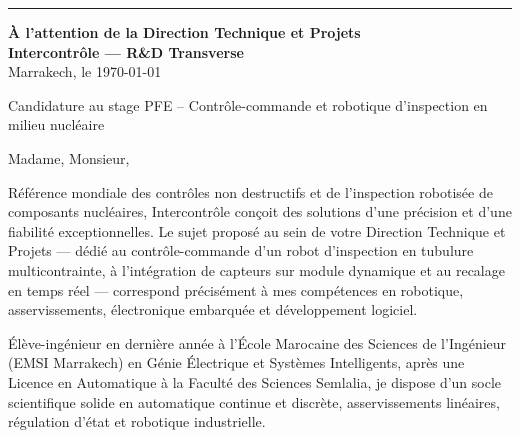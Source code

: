 \documentclass[10pt,a4paper]{altacv}
\makeatletter
\renewcommand{\makecvheader}{%
  \begingroup
    \raggedright\color{emphasis}%
    {\LARGE\bfseries\MakeUppercase{\@name}\par}\vspace{2pt}
    {\normalsize\bfseries\color{accent}\@tagline\par}\vspace{3.5pt}
    {\footnotesize\color{emphasis}\@personalinfo\par}
  \endgroup\vspace{4pt}
  {\color{heading}\rule{\linewidth}{1.2pt}}\par\vspace{8pt}
}
\makeatother
\begin{document}

\makecvheader

\begin{flushright}
  {\color{emphasis}\textbf{À l'attention de la Direction Technique et Projets}} \\[2pt]
  \textbf{Intercontrôle — R\&D Transverse} \\[8pt]
  Marrakech, le \today
\end{flushright}
\vspace{4pt}

 Candidature au stage PFE -- Contrôle-commande et robotique d'inspection en milieu nucléaire

\vspace{6pt}

\noindent Madame, Monsieur,

Référence mondiale des contrôles non destructifs et de l'inspection robotisée de composants nucléaires, Intercontrôle conçoit des solutions d'une précision et d'une fiabilité exceptionnelles. Le sujet proposé au sein de votre Direction Technique et Projets — dédié au contrôle-commande d'un robot d'inspection en tubulure multicontrainte, à l'intégration de capteurs sur module dynamique et au recalage en temps réel — correspond précisément à mes compétences en robotique, asservissements, électronique embarquée et développement logiciel.

Élève-ingénieur en dernière année à l'École Marocaine des Sciences de l'Ingénieur (EMSI Marrakech) en Génie Électrique et Systèmes Intelligents, après une Licence en Automatique à la Faculté des Sciences Semlalia, je dispose d'un socle scientifique solide en automatique continue et discrète, asservissements linéaires, régulation d'état et robotique industrielle.
\end{document}
